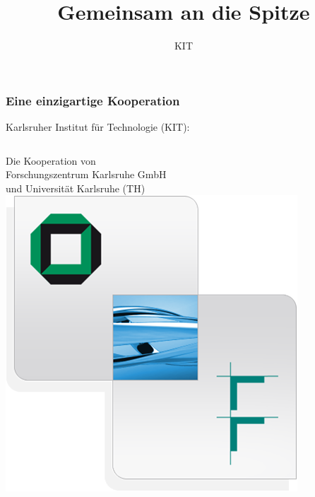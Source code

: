 \documentclass[t]{beamer}
\title[]{Gemeinsam an die Spitze}
\author[]{KIT}
\institute[IVD - Institut für Visualisierung und Datenanalyse]{KARLSRUHER INSTITUT FÜR TECHNOLOGIE (KIT)}
\newlength{\tmplen}
\begin{document}
\begin{frame}
  \maketitle
\end{frame}

\begin{frame}
  \frametitle{Eine einzigartige Kooperation}

  Karlsruher Institut für Technologie (KIT):
  \settowidth{\tmplen}{Forschungszentrum Karlsruhe GmbH}
  \vspace{5mm}

  \begin{columns}[onlytextwidth,b]
    \column{\tmplen}
    Die Kooperation von\\
    Forschungszentrum Karlsruhe GmbH\\
    und Universität Karlsruhe (TH)\\
    \mbox{}
    \addtolength{\tmplen}{-\textwidth}
    \setlength{\tmplen}{-\tmplen}
    \column{.8\tmplen}
    \hspace*{-.2\tmplen}\hfill\includegraphics[width=\tmplen]
      {Bilder/KIT-Kooperation}
  \end{columns}
\end{frame}
\end{document}
